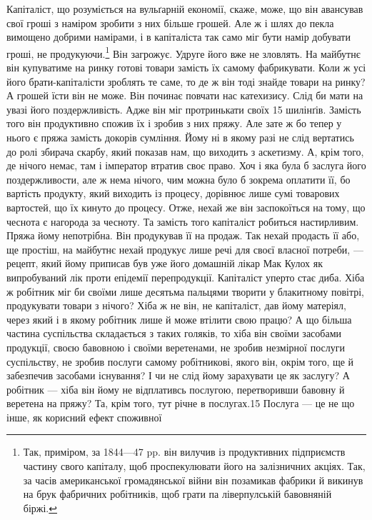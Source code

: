 Капіталіст, що розуміється на вульґарній економії, скаже,
може, що він авансував свої гроші з наміром зробити з них більше
грошей. Але ж і шлях до пекла вимощено добрими намірами, і в
капіталіста так само міг бути намір добувати гроші, не продукуючи.\footnote{
Так, приміром, за 1844—47 pp. він вилучив із продуктивних підприємств
частину свого капіталу, щоб проспекулювати його на залізничних
акціях. Так, за часів американської громадянської війни він позамикав
фабрики й викинув на брук фабричних робітників, щоб грати па ліверпулській
бавовняній біржі.
} Він загрожує. Удруге його вже
не зловлять. На майбутнє
він купуватиме на ринку готові товари замість їх самому
фабрикувати. Коли ж усі його брати-капіталісти зроблять те
саме, то де ж він тоді знайде товари на ринку? А грошей їсти
він не може. Він починає повчати нас катехизису. Слід би мати
на увазі його поздержливість. Адже він міг протринькати своїх
15 шилінґів. Замість того він продуктивно спожив їх і зробив
з них пряжу. Але зате ж бо тепер у нього є пряжа замість докорів
сумління. Йому ні в якому разі не слід вертатись до ролі
збирача скарбу, який показав нам, що виходить з аскетизму.
А, крім того, де нічого немає, там і імператор втратив своє право.
Хоч і яка була б заслуга його поздержливости, але ж нема нічого,
чим можна було б зокрема оплатити її, бо вартість продукту,
який виходить із процесу, дорівнює лише сумі товарових вартостей,
що їх кинуто до процесу. Отже, нехай же він заспокоїться
на тому, що чеснота є нагорода за чесноту. Та замість того капіталіст
робиться настирливим. Пряжа йому непотрібна. Він продукував
її на продаж. Так нехай продасть її або, ще простіш, на
майбутнє нехай продукує лише речі для своєї власної потреби, —
рецепт, який йому приписав був уже його домашній лікар Мак
Кулох як випробуваний лік проти епідемії перепродукції. Капіталіст
уперто стає диба. Хіба ж робітник міг би своїми лише
десятьма пальцями творити у блакитному повітрі, продукувати
товари з нічого? Хіба ж не він, не капіталіст, дав йому матеріял,
через який і в якому робітник лише й може втілити свою працю?
А що більша частина суспільства складається з таких голяків,
то хіба він своїми засобами продукції, своєю бавовною і своїми
веретенами, не зробив незмірної послуги суспільству, не зробив
послуги самому робітникові, якого він, окрім того, ще й забезпечив
засобами існування? І чи не слід йому зарахувати це як заслугу?
А робітник — хіба він йому не відплативсь послугою, перетворивши
бавовну й веретена на пряжу? Та, крім того, тут річне в
послугах.15 Послуга — це не що інше, як корисний ефект споживної
